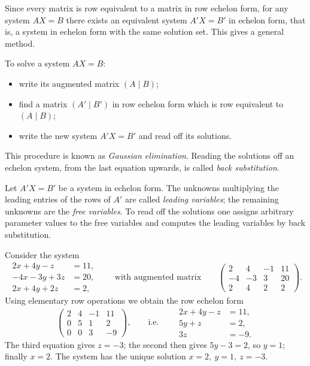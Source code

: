 Since every matrix is row equivalent to a matrix in row echelon form, for any system $AX=B$ there exists an
equivalent system $A'X=B'$ in echelon form, that is, a system in echelon form with the same solution set.
This gives a general method.

\begin{theorem}
To solve a system $AX=B$:
\begin{itemize}
\item write its augmented matrix $(A\mid B)$;
\item find a matrix $(A'\mid B')$ in row echelon form which is row equivalent to $(A\mid B)$;
\item write the new system $A' X = B'$ and read off its solutions.
\end{itemize}
\end{theorem}

\begin{remark}
This procedure is known as \emph{Gaussian elimination}. Reading the solutions off an echelon system, from
the last equation upwards, is called \emph{back substitution}.
\end{remark}

\begin{definition}
Let $A'X = B'$ be a system in echelon form. The unknowns multiplying the leading entries of the rows of
$A'$ are called \emph{leading variables}; the remaining unknowns are the \emph{free variables}. To read
off the solutions one assigns arbitrary parameter values to the free variables and computes the leading
variables by back substitution.
\end{definition}

\begin{example}
Consider the system
\[
\begin{aligned}
2x +4y-z &= 11,\\ -4x -3y+3z &= 20,\\ 2x +4y+2z &= 2,
\end{aligned}
\qquad\text{with augmented matrix}\qquad
\left( \begin{array}{ccc|c}
2 & 4 & -1 & 11\\ -4 & -3 & 3 & 20\\ 2 & 4 & 2 & 2
\end{array} \right).
\]
Using elementary row operations we obtain the row echelon form
\[
\left( \begin{array}{ccc|c}
2 & 4 & -1 & 11\\ 0 & 5 & 1 & 2\\ 0 & 0 & 3 & -9
\end{array} \right),
\qquad\text{i.e.}\qquad
\begin{aligned}
2x +4y-z &= 11,\\ 5y+z &= 2,\\ 3z &= -9.
\end{aligned}
\]
The third equation gives $z=-3$; the second then gives $5y-3=2$, so $y=1$; finally $x=2$. The system has the
unique solution $x=2,\ y=1,\ z=-3$.
\end{example}

